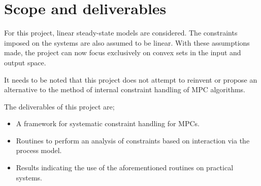 \section{Scope and deliverables}
For this project, linear steady-state models are considered.
The constraints imposed on the systems are also assumed to be linear.
With these assumptions made, the project can now focus exclusively on convex sets in the input and output space.

It needs to be noted that this project does not attempt to reinvent or propose an alternative to the method of internal constraint handling of MPC algorithms.

The deliverables of this project are;
\begin{itemize}
\item A framework for systematic constraint handling for MPCs.
\item Routines to perform an analysis of constraints based on interaction via the process model.
\item Results indicating the use of the aforementioned routines on practical systems.
\end{itemize}


